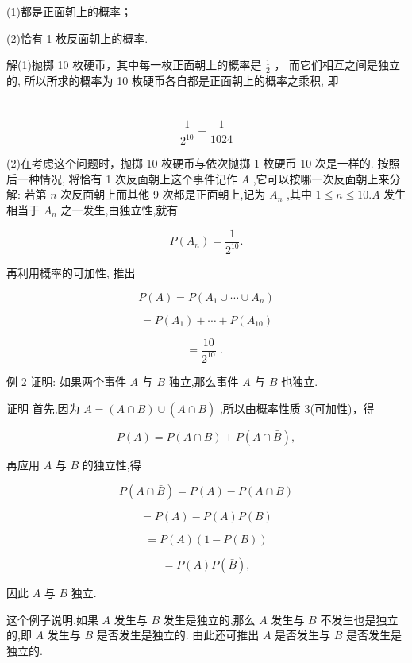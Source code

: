 \documentclass[10pt]{article}
\begin{document}
(1)都是正面朝上的概率；

(2)恰有 1 枚反面朝上的概率.

解(1)抛掷 10 枚硬币，其中每一枚正面朝上的概率是 \(\frac{1}{2}\) ， 而它们相互之间是独立的, 所以所求的概率为 10 枚硬币各自都是正面朝上的概率之乘积, 即

\section*{}

\[
\frac{1}{{2}^{10}} = \frac{1}{1024}
\]

(2)在考虑这个问题时，抛掷 10 枚硬币与依次抛掷 1 枚硬币 10 次是一样的. 按照后一种情况, 将恰有 1 次反面朝上这个事件记作 \(A\) ,它可以按哪一次反面朝上来分解: 若第 \(n\) 次反面朝上而其他 9 次都是正面朝上,记为 \({A}_{n}\) ,其中 \(1 \leq  n \leq  {10}.A\) 发生相当于 \({A}_{n}\) 之一发生,由独立性,就有

\[
P\left( {A}_{n}\right)  = \frac{1}{{2}^{10}}.
\]

再利用概率的可加性, 推出

\[
P\left( A\right)  = P\left( {{A}_{1} \cup  \cdots  \cup  {A}_{n}}\right)
\]

\[
= P\left( {A}_{1}\right)  + \cdots  + P\left( {A}_{10}\right)
\]

\[
= \frac{10}{{2}^{10}}\text{ . }
\]

例 2 证明: 如果两个事件 \(A\) 与 \(B\) 独立,那么事件 \(A\) 与 \(\bar{B}\) 也独立.

证明 首先,因为 \(A = \left( {A \cap  B}\right)  \cup  \left( {A \cap  \bar{B}}\right)\) ,所以由概率性质 3(可加性)，得

\[
P\left( A\right)  = P\left( {A \cap  B}\right)  + P\left( {A \cap  \bar{B}}\right) ,
\]

再应用 \(A\) 与 \(B\) 的独立性,得

\[
P\left( {A \cap  \bar{B}}\right)  = P\left( A\right)  - P\left( {A \cap  B}\right)
\]

\[
= P\left( A\right)  - P\left( A\right) P\left( B\right)
\]

\[
= P\left( A\right) \left( {1 - P\left( B\right) }\right)
\]

\[
= P\left( A\right) P\left( \bar{B}\right) ,
\]

因此 \(A\) 与 \(\bar{B}\) 独立.

这个例子说明,如果 \(A\) 发生与 \(B\) 发生是独立的,那么 \(A\) 发生与 \(B\) 不发生也是独立的,即 \(A\) 发生与 \(B\) 是否发生是独立的. 由此还可推出 \(A\) 是否发生与 \(B\) 是否发生是独立的.
\end{document}
